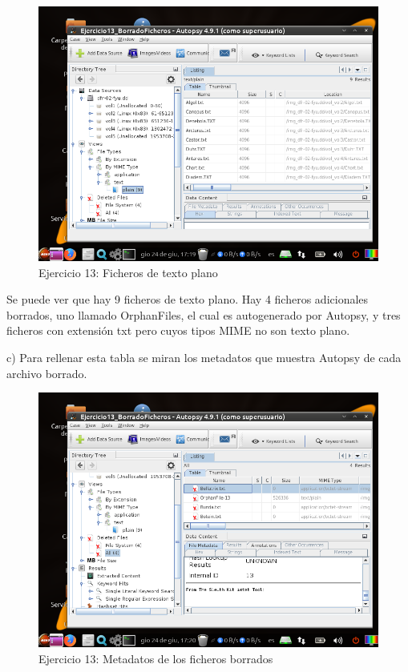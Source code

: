 \documentclass[11pt]{article}
\begin{document}
\begin{figure}[H]
    \caption{Ejercicio 13: Ficheros de texto plano}
    \centering
    \includegraphics[scale=0.7]{e13-6.png}
\end{figure}

Se puede ver que hay 9 ficheros de texto plano. Hay 4 ficheros adicionales borrados, uno llamado OrphanFiles, el cual es autogenerado por Autopsy, y tres ficheros con extensión txt pero cuyos tipos MIME no son texto plano.

c) Para rellenar esta tabla se miran los metadatos que muestra Autopsy de cada archivo borrado.

\begin{figure}[H]
    \caption{Ejercicio 13: Metadatos de los ficheros borrados}
    \centering
    \includegraphics[scale=0.7]{e13-7.png}
\end{figure}
\end{document}
